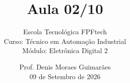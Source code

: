 
\title{Aula 02/10}

\subtitle{\texorpdfstring{%
Escola Tecnológica FPFtech\\[0.3cm]
Curso: Técnico em Automação Industrial\\[0.3cm]
Módulo: Eletrônica Digital 2
}{Escola Tecnológica FPFtech — Curso: Técnico em Automação Industrial — Módulo: Eletrônica Digital 2}}

\author{\texorpdfstring{%
Prof. Denis Moraes Guimarães\\
\small 09 de Setembro de 2026
}{Prof. Denis Moraes Guimarães}}

\date{}
